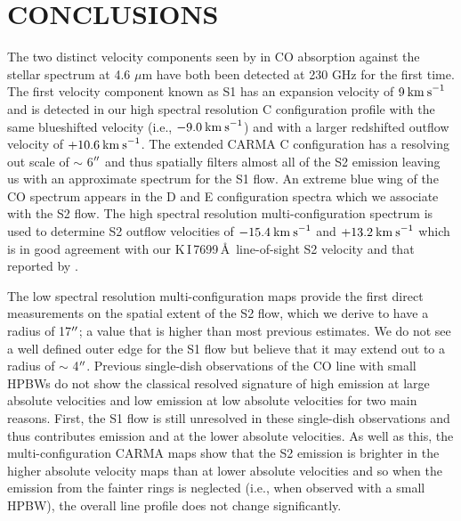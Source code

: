 \documentclass[iop]{emulateapj}
\begin{document}
\section{CONCLUSIONS}
The two distinct velocity components seen by \cite{1979ApJ...233L.135B} in CO absorption against the stellar spectrum at 4.6 $\mu$m have both been detected at 230 GHz for the first time. The first velocity component known as S1 has an expansion velocity of $9\>{\rm km\>s}^{-1}$ \citep{1979ApJ...233L.135B} and is detected in our high spectral resolution C configuration profile with the same blueshifted velocity (i.e., $-9.0\>{\rm km\>s}^{-1}$) and with a larger redshifted outflow velocity of $+10.6\>{\rm km\>s}^{-1}$. The extended CARMA C configuration has a resolving out scale of $\sim$ 6$\mbox{$^{\prime\prime}$}$ and thus spatially filters almost all of the S2 emission leaving us with an approximate spectrum for the S1 flow. An extreme blue wing of the CO spectrum appears in the D and E configuration spectra which we associate with the S2 flow. The high spectral resolution multi-configuration spectrum is used to determine S2 outflow velocities of $-15.4\>{\rm km\>s}^{-1}$ and $+13.2\>{\rm km\>s}^{-1}$ which is in good agreement with our K\,I\,7699\,\AA \ line-of-sight S2 velocity and that reported by \cite{1979ApJ...233L.135B}. 

The low spectral resolution multi-configuration maps provide the first direct measurements on the spatial extent of the S2 flow, which we derive to have a radius of 17$\mbox{$^{\prime\prime}$}$; a value that is higher than most previous estimates. We do not see a well defined outer edge for the S1 flow but believe that it may extend out to a radius of $\sim$ 4$\mbox{$^{\prime\prime}$}$. Previous single-dish observations of the CO line with small HPBWs do not show the classical resolved signature of high emission at large absolute velocities and low emission at low absolute velocities for two main reasons. First, the S1 flow is still unresolved in these single-dish observations and thus contributes emission and at the lower absolute velocities. As well as this, the multi-configuration CARMA maps show that the S2 emission is brighter in the higher absolute velocity maps than at lower absolute velocities and so when the emission from the fainter rings is neglected (i.e., when observed with a small HPBW), the overall line profile does not change significantly.
\end{document}

